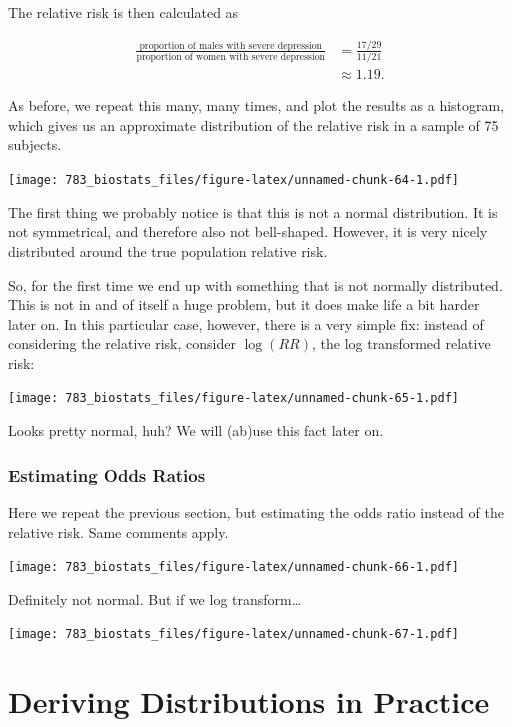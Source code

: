 \documentclass[]{book}
\theoremstyle{definition}
\theoremstyle{definition}
\theoremstyle{definition}
\theoremstyle{remark}
\begin{document}
The relative risk is then calculated as

\begin{align*}
  \frac{\text{proportion of males with severe depression}}{\text{proportion of women with severe depression}} &= \frac{17/29}{11/21} \\ & \approx 1.19.
\end{align*}

As before, we repeat this many, many times, and plot the results as a histogram, which gives us an approximate distribution of the relative risk in a sample of 75 subjects.

\texttt{[image: 783\_biostats\_files/figure-latex/unnamed-chunk-64-1.pdf]}

The first thing we probably notice is that this is not a normal distribution. It is not symmetrical, and therefore also not bell-shaped. However, it is very nicely distributed around the true population relative risk.

So, for the first time we end up with something that is not normally distributed. This is not in and of itself a huge problem, but it does make life a bit harder later on. In this particular case, however, there is a very simple fix: instead of considering the relative risk, consider \(\log(RR)\), the log transformed relative risk:

\texttt{[image: 783\_biostats\_files/figure-latex/unnamed-chunk-65-1.pdf]}

Looks pretty normal, huh? We will (ab)use this fact later on.

\hypertarget{estimating-odds-ratios}{%
\subsubsection*{Estimating Odds Ratios}\label{estimating-odds-ratios}}

Here we repeat the previous section, but estimating the odds ratio instead of the relative risk. Same comments apply.

\texttt{[image: 783\_biostats\_files/figure-latex/unnamed-chunk-66-1.pdf]}

Definitely not normal. But if we log transform\ldots{}

\texttt{[image: 783\_biostats\_files/figure-latex/unnamed-chunk-67-1.pdf]}

\hypertarget{deriving-distributions-in-practice}{%
\section{Deriving Distributions in Practice}\label{deriving-distributions-in-practice}}
\end{document}
